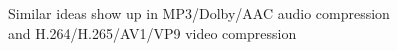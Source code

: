 \documentclass[preview]{standalone}
\begin{document}
\begin{center}
Similar ideas show up in MP3/Dolby/AAC audio compression\\and H.264/H.265/AV1/VP9 video compression
\end{center}
\end{document}
